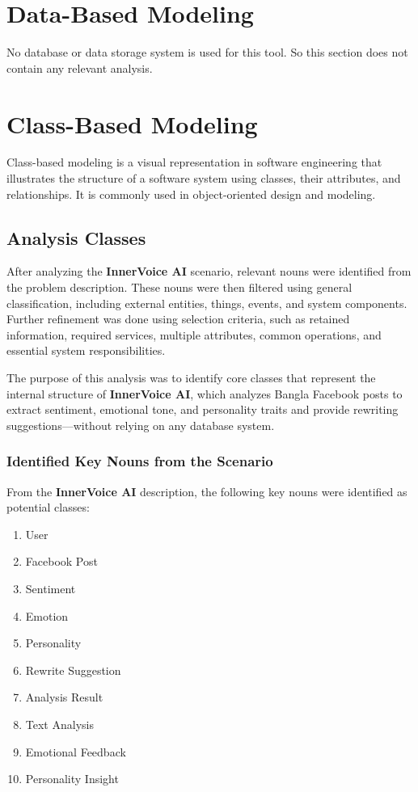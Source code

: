 \documentclass[12pt,a4paper]{report}
\begin{document}
\chapter{Data-Based Modeling}

No database or data storage system is used for this tool. So this section does not contain any relevant analysis.

\chapter{Class-Based Modeling}

Class-based modeling is a visual representation in software engineering that illustrates the structure of a software system using classes, their attributes, and relationships. It is commonly used in object-oriented design and modeling.

\section{Analysis Classes}

After analyzing the \textbf{InnerVoice AI} scenario, relevant nouns were identified from the problem description. These nouns were then filtered using general classification, including external entities, things, events, and system components. Further refinement was done using selection criteria, such as retained information, required services, multiple attributes, common operations, and essential system responsibilities.

The purpose of this analysis was to identify core classes that represent the internal structure of \textbf{InnerVoice AI}, which analyzes Bangla Facebook posts to extract sentiment, emotional tone, and personality traits and provide rewriting suggestions—without relying on any database system.

\subsection{Identified Key Nouns from the Scenario}

From the \textbf{InnerVoice AI} description, the following key nouns were identified as potential classes:

\begin{enumerate}
    \item User
    \item Facebook Post
    \item Sentiment
    \item Emotion
    \item Personality
    \item Rewrite Suggestion
    \item Analysis Result
    \item Text Analysis
    \item Emotional Feedback
    \item Personality Insight
\end{enumerate}
\end{document}
